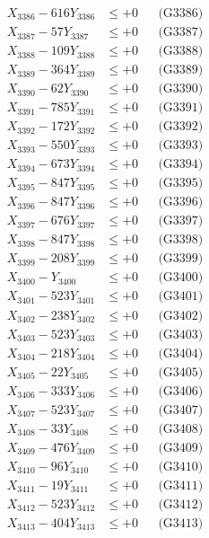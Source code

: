 \documentclass[a4paper,10pt]{article}
\begin{document}
{\begin{align}
X_{3386} - 616Y_{3386} &\leq +0 && \text{(G3386)} \\
X_{3387} - 57Y_{3387} &\leq +0 && \text{(G3387)} \\
X_{3388} - 109Y_{3388} &\leq +0 && \text{(G3388)} \\
X_{3389} - 364Y_{3389} &\leq +0 && \text{(G3389)} \\
X_{3390} - 62Y_{3390} &\leq +0 && \text{(G3390)} \\
\allowbreak
X_{3391} - 785Y_{3391} &\leq +0 && \text{(G3391)} \\
X_{3392} - 172Y_{3392} &\leq +0 && \text{(G3392)} \\
X_{3393} - 550Y_{3393} &\leq +0 && \text{(G3393)} \\
X_{3394} - 673Y_{3394} &\leq +0 && \text{(G3394)} \\
X_{3395} - 847Y_{3395} &\leq +0 && \text{(G3395)} \\
X_{3396} - 847Y_{3396} &\leq +0 && \text{(G3396)} \\
X_{3397} - 676Y_{3397} &\leq +0 && \text{(G3397)} \\
X_{3398} - 847Y_{3398} &\leq +0 && \text{(G3398)} \\
X_{3399} - 208Y_{3399} &\leq +0 && \text{(G3399)} \\
X_{3400} - Y_{3400} &\leq +0 && \text{(G3400)} \\
\allowbreak
X_{3401} - 523Y_{3401} &\leq +0 && \text{(G3401)} \\
X_{3402} - 238Y_{3402} &\leq +0 && \text{(G3402)} \\
X_{3403} - 523Y_{3403} &\leq +0 && \text{(G3403)} \\
X_{3404} - 218Y_{3404} &\leq +0 && \text{(G3404)} \\
X_{3405} - 22Y_{3405} &\leq +0 && \text{(G3405)} \\
X_{3406} - 333Y_{3406} &\leq +0 && \text{(G3406)} \\
X_{3407} - 523Y_{3407} &\leq +0 && \text{(G3407)} \\
X_{3408} - 33Y_{3408} &\leq +0 && \text{(G3408)} \\
X_{3409} - 476Y_{3409} &\leq +0 && \text{(G3409)} \\
X_{3410} - 96Y_{3410} &\leq +0 && \text{(G3410)} \\
\allowbreak
X_{3411} - 19Y_{3411} &\leq +0 && \text{(G3411)} \\
X_{3412} - 523Y_{3412} &\leq +0 && \text{(G3412)} \\
X_{3413} - 404Y_{3413} &\leq +0 && \text{(G3413)} \\

\end{align}}
\end{document}
